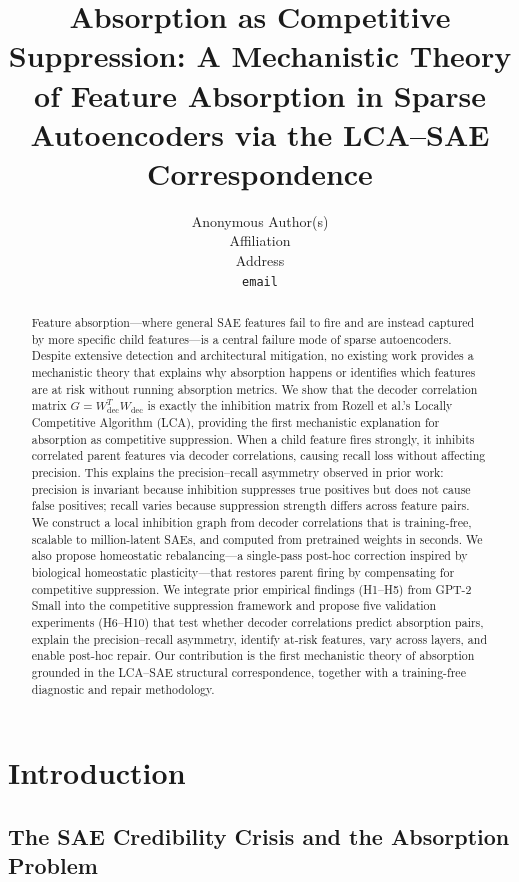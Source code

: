 \documentclass{article}
\title{Absorption as Competitive Suppression: A Mechanistic Theory of Feature Absorption in Sparse Autoencoders via the LCA--SAE Correspondence}
\author{%
  Anonymous Author(s) \\
  Affiliation \\
  Address \\
  \texttt{email} \\
}
\begin{document}
\maketitle

\begin{abstract}
Feature absorption---where general SAE features fail to fire and are instead captured by more specific child features---is a central failure mode of sparse autoencoders. Despite extensive detection and architectural mitigation, no existing work provides a mechanistic theory that explains why absorption happens or identifies which features are at risk without running absorption metrics. We show that the decoder correlation matrix $G = W_{\text{dec}}^T W_{\text{dec}}$ is exactly the inhibition matrix from Rozell et al.'s Locally Competitive Algorithm (LCA), providing the first mechanistic explanation for absorption as competitive suppression. When a child feature fires strongly, it inhibits correlated parent features via decoder correlations, causing recall loss without affecting precision. This explains the precision--recall asymmetry observed in prior work: precision is invariant because inhibition suppresses true positives but does not cause false positives; recall varies because suppression strength differs across feature pairs. We construct a local inhibition graph from decoder correlations that is training-free, scalable to million-latent SAEs, and computed from pretrained weights in seconds. We also propose homeostatic rebalancing---a single-pass post-hoc correction inspired by biological homeostatic plasticity---that restores parent firing by compensating for competitive suppression. We integrate prior empirical findings (H1--H5) from GPT-2 Small into the competitive suppression framework and propose five validation experiments (H6--H10) that test whether decoder correlations predict absorption pairs, explain the precision--recall asymmetry, identify at-risk features, vary across layers, and enable post-hoc repair. Our contribution is the first mechanistic theory of absorption grounded in the LCA--SAE structural correspondence, together with a training-free diagnostic and repair methodology.
\end{abstract}

\section{Introduction}

\subsection{The SAE Credibility Crisis and the Absorption Problem}
\end{document}

